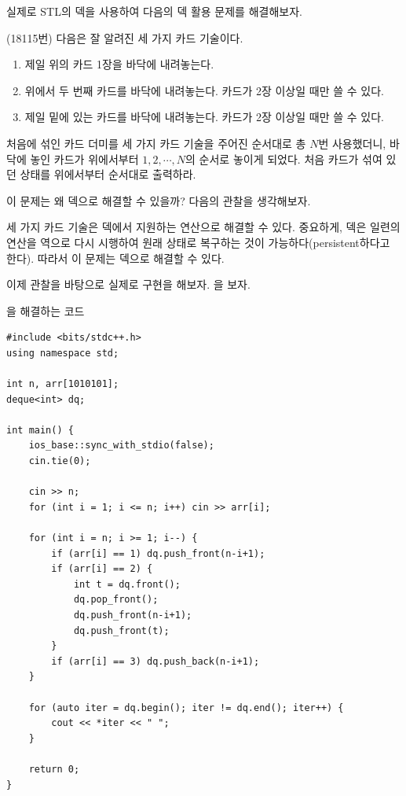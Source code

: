 실제로 STL의 덱을 사용하여 다음의 덱 활용 문제를 해결해보자.

\begin{example} \label{ex: deque}
    (18115번) 다음은 잘 알려진 세 가지 카드 기술이다.
    \begin{enumerate}
        \item 제일 위의 카드 1장을 바닥에 내려놓는다.
        \item 위에서 두 번째 카드를 바닥에 내려놓는다. 카드가 2장 이상일 때만 쓸 수 있다.
        \item 제일 밑에 있는 카드를 바닥에 내려놓는다. 카드가 2장 이상일 때만 쓸 수 있다.
    \end{enumerate}
    처음에 섞인 카드 더미를 세 가지 카드 기술을 주어진 순서대로 총 $N$번 사용했더니, 바닥에 놓인 카드가 위에서부터 $1, 2, \cdots, N$의 순서로 놓이게 되었다. 처음 카드가 섞여 있던 상태를 위에서부터 순서대로 출력하라.
\end{example}

이 문제는 왜 덱으로 해결할 수 있을까? 다음의 관찰을 생각해보자.

\begin{obs}
    세 가지 카드 기술은 덱에서 지원하는 연산으로 해결할 수 있다. 중요하게, 덱은 일련의 연산을 역으로 다시 시행하여 원래 상태로 복구하는 것이 가능하다(persistent하다고 한다). 따라서 이 문제는 덱으로 해결할 수 있다.
\end{obs}

이제 관찰을 바탕으로 실제로 구현을 해보자. 을 보자.

\begin{code} \label{code: card-placing}
을 해결하는 코드
\begin{lstlisting}
#include <bits/stdc++.h>
using namespace std;

int n, arr[1010101];
deque<int> dq;

int main() {
    ios_base::sync_with_stdio(false);
    cin.tie(0);

    cin >> n;
    for (int i = 1; i <= n; i++) cin >> arr[i];

    for (int i = n; i >= 1; i--) {
        if (arr[i] == 1) dq.push_front(n-i+1);
        if (arr[i] == 2) {
            int t = dq.front();
            dq.pop_front();
            dq.push_front(n-i+1);
            dq.push_front(t);
        }
        if (arr[i] == 3) dq.push_back(n-i+1);
    }

    for (auto iter = dq.begin(); iter != dq.end(); iter++) {
        cout << *iter << " ";
    }

    return 0;
}
\end{lstlisting}
\end{code}

